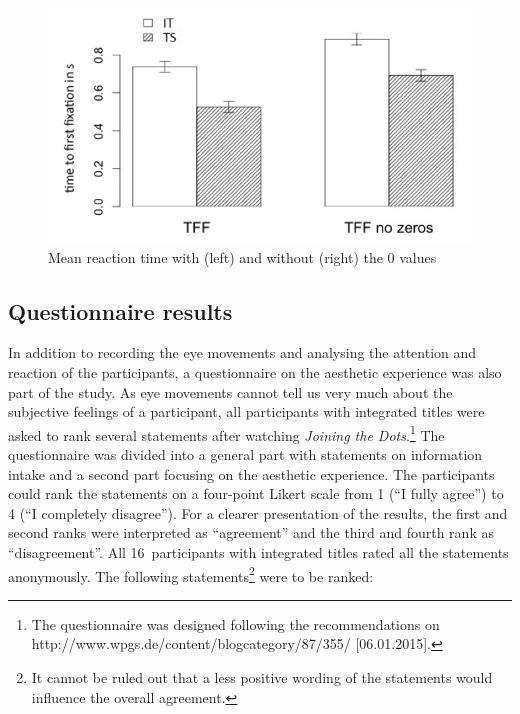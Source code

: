 \documentclass[output=paper]{langsci/langscibook}
\begin{document}
  
\begin{figure} 
  \includegraphics[height=.3\textheight]{figures/Fox10.png}
  \caption{Mean reaction time with (left) and without (right) the 0 values}
  \label{fox:fig:10}
\end{figure}
 

\subsection{Questionnaire results}

In addition to recording the eye movements and analysing the attention and reaction of the participants, a questionnaire on the aesthetic experience was also part of the study. As eye movements cannot tell us very much about the subjective feelings of a participant, all participants with integrated titles were asked to rank several statements after watching \textit{Joining the Dots}.\footnote{The questionnaire was designed following the recommendations on http://www.wpgs.de/content/blogcategory/87/355/ [06.01.2015].} The questionnaire was divided into a general part with statements on information intake and a second part focusing on the aesthetic experience. The participants could rank the statements on a four-point Likert scale from 1 (“I fully agree”) to 4 (“I completely disagree”). For a clearer presentation of the results, the first and second ranks were interpreted as “agreement” and the third and fourth rank as “disagreement”. All 16~participants with integrated titles rated all the statements anonymously. The following statements\footnote{It cannot be ruled out that a less positive wording of the statements would influence the overall agreement.} were to be ranked:
\end{document}
